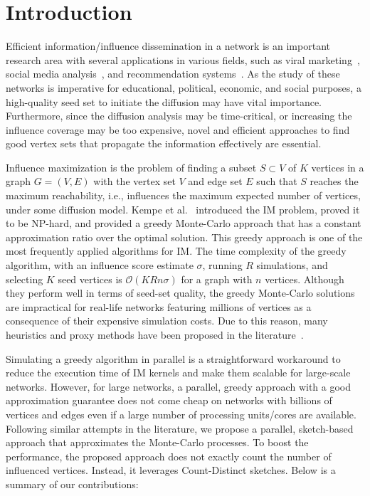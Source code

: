 \documentclass[final,5p,times,twocolumn]{elsarticle}
\newcommand\fixme[1]{#1}
\begin{document}
\section{Introduction}

Efficient information/influence dissemination in a network is an important research area with several applications in various fields, \fixme{such as viral marketing~\cite{leskovec2007dynamics, trusov2009effects}, social media analysis~\cite{zeng2010social, moreno2004dynamics}, and recommendation systems~\cite{lu2012recommender}.}
As the study of these networks is imperative for \fixme{educational, political, economic, and social purposes,} a high-quality seed set to initiate the diffusion may have vital importance.
Furthermore, since the diffusion analysis may be time-critical, or increasing the influence coverage may be too expensive, novel and efficient approaches to find good vertex sets that propagate the information effectively are essential.

Influence maximization is the problem of finding a subset $S \subset V$ of $K$ vertices in a graph $G = (V, E)$ with the vertex set $V$ and edge set $E$ such that $S$ reaches the maximum reachability, i.e., influences the maximum expected number of vertices, under some diffusion model. Kempe et al.~\cite{kempe2003maximizing} introduced the IM problem, \fixme{proved it to be NP-hard,} and provided a greedy Monte-Carlo approach that has a \fixme{constant approximation ratio over the optimal solution}. This greedy approach is one of the most frequently applied algorithms for IM. The time complexity of the greedy algorithm, with an influence score estimate $\sigma$, running $R$ simulations, and selecting $K$ seed vertices is $\mathcal{O}(KRn\sigma)$ for a graph with $n$ vertices. Although they perform well in terms of seed-set quality, the greedy Monte-Carlo solutions are impractical for real-life networks featuring millions of vertices as a consequence of their expensive simulation costs. Due to this reason, many \fixme{heuristics and proxy methods have been proposed in the literature~\cite{MixGreedy, narayanam2010shapley, kimura2007extracting, chen2010PMIA,chen2010LDAG, kim2013scalable, cohen2014sketch, goyal2011simpath, jung2012irie,cheng2014imrank,liu2014influence,galhotra2016holistic}}.

Simulating a greedy algorithm in \fixme{parallel} is a \fixme{straightforward} workaround to reduce the execution time of IM kernels and make them scalable for large-scale networks. However, for large networks, a parallel, greedy approach with a good approximation guarantee does not come cheap on networks with billions of vertices and edges even if a large number of processing units/cores are available. Following similar attempts in the literature, we propose a parallel, sketch-based approach that approximates the Monte-Carlo processes. To boost the performance, the proposed approach does not exactly count the number of influenced vertices. Instead, it leverages Count-Distinct sketches. Below is a summary of our contributions:
\end{document}
